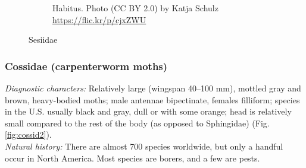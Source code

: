 \documentclass[letterpaper, 11pt]{article}
\begin{document}
\begin{figure}[ht!]
\begin{subfigure}[ht!]{0.40\textwidth}
        \caption{Habitus. Photo (CC BY 2.0) by Katja Schulz \url{https://flic.kr/p/cjxZWU}}
        \label{fig:sesiid2}
    \end{subfigure}
    \caption{Sesiidae}\label{fig:sesiids}
\end{figure}

\subsubsection{Cossidae (carpenterworm moths)}
\noindent{}\textit{Diagnostic characters:} Relatively large (wingspan 40--100 mm), mottled gray and brown, heavy-bodied moths; male antennae bipectinate, females filliform; species in the U.S. usually black and gray, dull or with some orange; head is relatively small compared to the rest of the body (as opposed to Sphingidae) (Fig. \ref{fig:cossid2}).\\

\noindent{}\textit{Natural history:} There are almost 700 species worldwide, but only a handful occur in North America. Most species are borers, and a few are pests.
\end{document}
